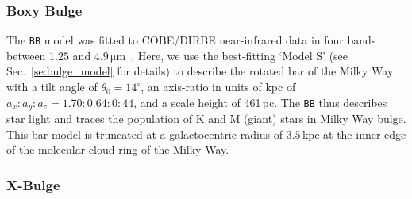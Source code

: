\documentclass[doublespace,nopageskip]{VTthesis} %
\newcommand{\mrm}[1]{\mathrm{#1}}
\DeclareMathOperator\sech{sech}
\begin{document}
\subsubsection{Boxy Bulge}





The \texttt{BB} model was fitted to COBE/DIRBE near-infrared data in four bands between $1.25$ and $4.9\,\mrm{\mu m}$~\citet{Freudenreich1998_BoxyBulge_COBE}.
%
Here, we use the best-fitting `Model S' (see Sec.~\ref{se:bulge_model} for details) to describe the rotated bar of the Milky Way with a tilt angle of $\theta_0 = 14^{\circ}$, an axis-ratio in units of kpc of $a_x : a_y : a_z = 1.70 : 0.64 : 0:44$, and a scale height of 461\,pc.
%
The \texttt{BB} thus describes star light and traces the population of K and M (giant) stars in Milky Way bulge.
%
This bar model is truncated at a galactocentric radius of $3.5\,\mrm{kpc}$ at the inner edge of the molecular cloud ring of the Milky Way. 


\subsubsection{X-Bulge}
\end{document}
